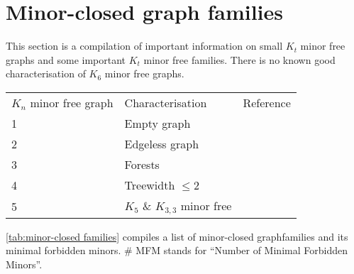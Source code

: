 \section{Minor-closed graph families}\label{sec:minor_closed_families}
This section is a compilation of important information on small $K_t$ minor free graphs and some important $K_t$ minor free families. There is no known good characterisation of $K_6$ minor free graphs. 

\begin{table}[h!]
    \centering
    \begin{tabular}{@{}lll@{}}
        \toprule
        $K_n$ minor free graph  & Characterisation  & Reference \\
        1                       & Empty graph       &           \\
        2                       & Edgeless graph    &           \\
        3                       & Forests           &           \\
        4                       & Treewidth $\leq 2$&  {\textcite{norinMath599GraphMinors2017}}         \\
        5                       & $K_5$ \& $K_{3,3}$ minor free & {\textcite{wagnerUeberEigenschaftEbenen1937}}
    \end{tabular}
\end{table}


\cref{tab:minor-closed families} compiles a list of minor-closed graphfamilies and its minimal forbidden minors. \# MFM stands for ``Number of Minimal Forbidden Minors''.

